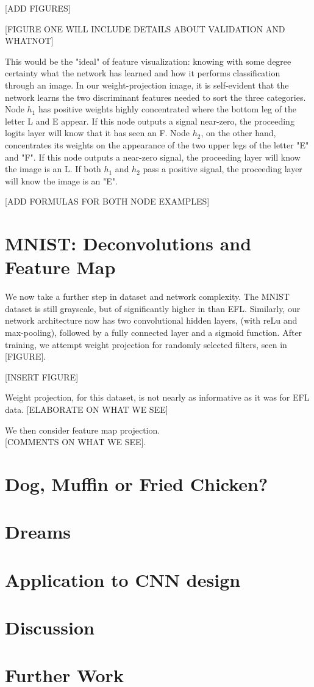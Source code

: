 \documentclass[12pt]{article}
\begin{document}
[ADD FIGURES]

[FIGURE ONE WILL INCLUDE DETAILS ABOUT VALIDATION AND WHATNOT]

This would be the "ideal" of feature visualization: knowing with some degree certainty what the network has learned and how it performs classification through an image. In our weight-projection image, it is self-evident that the network learns the two discriminant features needed to sort the three categories. Node $h_1$ has positive weights highly concentrated where the bottom leg of the letter L and E appear. If this node outputs a signal near-zero, the proceeding logits layer will know that it has seen an F. Node $h_2$, on the other hand, concentrates its weights on the appearance of the two upper legs of the letter "E" and "F". If this node outputs a near-zero signal, the proceeding layer will know the image is an L. If both $h_1$ and $h_2$ pass a positive signal, the proceeding layer will know the image is an "E".

[ADD FORMULAS FOR BOTH NODE EXAMPLES]

\section{MNIST: Deconvolutions and Feature Map}

We now take a further step in dataset and network complexity. The MNIST dataset is still grayscale, but of significantly higher in than EFL. Similarly, our network architecture now has two convolutional hidden layers, (with reLu and max-pooling), followed by a fully connected layer and a sigmoid function. After training, we attempt weight projection for randomly selected filters, seen in [FIGURE].

[INSERT FIGURE]

Weight projection, for this dataset, is not nearly as informative as it was for EFL data. [ELABORATE ON WHAT WE SEE]

We then consider feature map projection. \\

[COMMENTS ON WHAT WE SEE]. \\


\section{Dog, Muffin or Fried Chicken?}



\section{Dreams}

\section{Application to CNN design}

\section{Discussion}

\section{Further Work}
\end{document}
